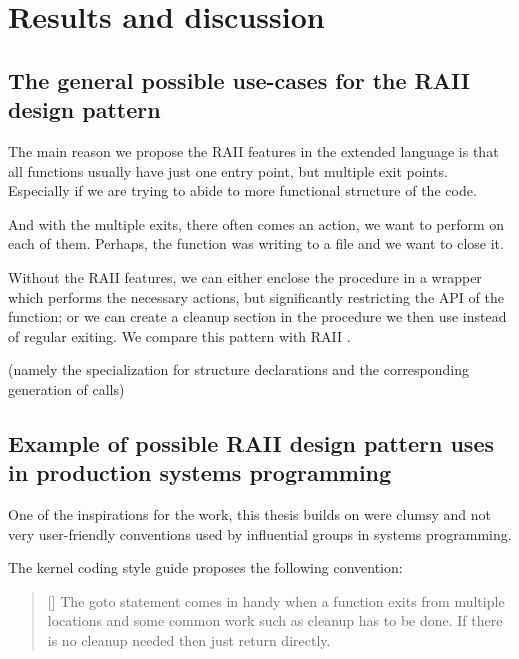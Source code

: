 \chapter{Results and discussion}

\section{The general possible use-cases for the RAII design pattern}

The main reason we propose the RAII features in the extended \cmm language is that all functions usually have just one entry point, but multiple exit points. Especially if we are trying to abide to more functional structure of the code.

And with the multiple exits, there often comes an action, we want to perform on each of them. Perhaps, the function was writing to a file and we want to close it.

Without the RAII features, we can either enclose the procedure in a wrapper which performs the necessary actions, but significantly restricting the API of the function; or we can create a cleanup section in the procedure we then use instead of regular exiting. We compare this pattern with RAII .


 (namely the  specialization for structure declarations and the corresponding generation of  calls)

\section{Example of possible RAII design pattern uses in production systems programming}

One of the inspirations for the work, this thesis builds on were clumsy and not very user-friendly conventions used by influential groups in systems programming.

The kernel coding style guide proposes the following convention:

\begin{quotation}[]
  The goto statement comes in handy when a function exits from multiple locations and some common work such as cleanup has to be done. If there is no cleanup needed then just return directly.
\end{quotation}

